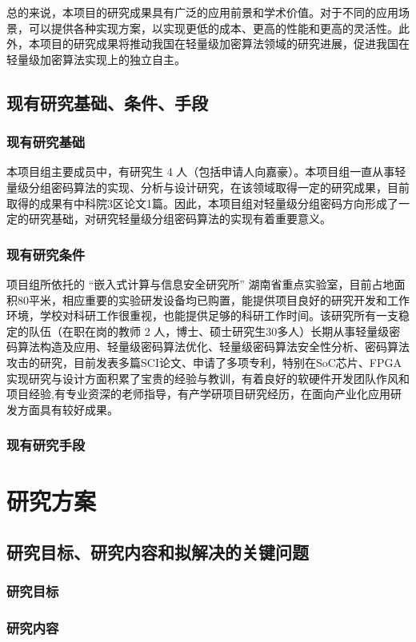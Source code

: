 \documentclass{ctexart}
\begin{document}
总的来说，本项目的研究成果具有广泛的应用前景和学术价值。对于不同的应用场景，可以提供各种实现方案，以实现更低的成本、更高的性能和更高的灵活性。此外，本项目的研究成果将推动我国在轻量级加密算法领域的研究进展，促进我国在轻量级加密算法实现上的独立自主。

\subsection{现有研究基础、条件、手段}
\subsubsection{现有研究基础}
本项目组主要成员中，有研究生 4 人（包括申请人向嘉豪）。本项目组一直从事轻量级分组密码算法的实现、分析与设计研究，在该领域取得一定的研究成果，目前取得的成果有中科院3区论文1篇。因此，本项目组对轻量级分组密码方向形成了一定的研究基础，对研究轻量级分组密码算法的实现有着重要意义。
\subsubsection{现有研究条件}
项目组所依托的 “嵌入式计算与信息安全研究所” 湖南省重点实验室，目前占地面积80平米，相应重要的实验研发设备均已购置，能提供项目良好的研究开发和工作环境，学校对科研工作很重视，也能提供足够的科研工作时间。该研究所有一支稳定的队伍（在职在岗的教师 2 人，博士、硕士研究生30多人）长期从事轻量级密码算法构造及应用、轻量级密码算法优化、轻量级密码算法安全性分析、密码算法攻击的研究，目前发表多篇SCI论文、申请了多项专利，特别在SoC芯片、FPGA实现研究与设计方面积累了宝贵的经验与教训，有着良好的软硬件开发团队作风和项目经验,有专业资深的老师指导，有产学研项目研究经历，在面向产业化应用研发方面具有较好成果。

\subsubsection{现有研究手段}


\section{研究方案}
\subsection{研究目标、研究内容和拟解决的关键问题}
\subsubsection{研究目标}
\subsubsection{研究内容}
\end{document}
